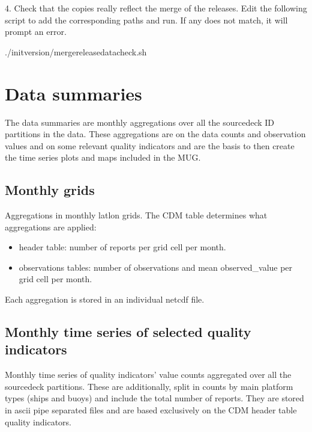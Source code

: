 \documentclass[letterpaper,10pt,english]{sphinxmanual}
\begin{document}
4. Check that the copies really reflect the merge of the releases. Edit the following script to add the corresponding paths and run. If any does not match, it will prompt an error.

\begin{sphinxVerbatim}[commandchars=\\\{\}]
./init\PYGZus{}version/merge\PYGZus{}release\PYGZus{}data\PYGZus{}check.sh
\end{sphinxVerbatim}


\section{Data summaries}
\label{\detokenize{index:data-summaries}}
The data summaries are monthly aggregations over all the source\sphinxhyphen{}deck ID partitions
in the data. These aggregations are on the data counts and observation values
and on some relevant quality indicators and are the basis to then create the
time series plots and maps included in the MUG.


\subsection{Monthly grids}
\label{\detokenize{index:monthly-grids}}\label{\detokenize{index:monthly-grids-um-section}}
Aggregations in monthly lat\sphinxhyphen{}lon grids. The CDM table determines what
aggregations are applied:
\begin{itemize}
\item {} 
header table: number of reports per grid cell per month.

\item {} 
observations tables: number of observations and mean observed\_value per grid cell per month.

\end{itemize}

Each aggregation is stored in an individual netcdf file.


\subsection{Monthly time series of selected quality indicators}
\label{\detokenize{index:monthly-time-series-of-selected-quality-indicators}}\label{\detokenize{index:qi-counts-um-section}}
Monthly time series of quality indicators’ value counts aggregated over all the source\sphinxhyphen{}deck partitions. 
These are additionally, split in counts by main platform types (ships and buoys) and include the total number of reports. 
They are stored in ascii pipe separated files and are based exclusively on the CDM header table quality indicators.
\end{document}
